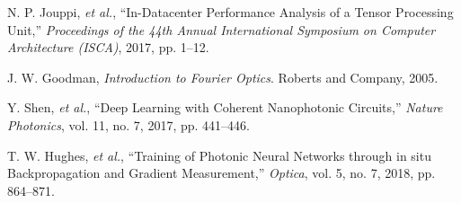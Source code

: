 \documentclass[conference]{IEEEtran}
\begin{document}

\begin{thebibliography}{00}
 N. P. Jouppi, \emph{et al.}, ``In-Datacenter Performance Analysis of a Tensor Processing Unit,'' \emph{Proceedings of the 44th Annual International Symposium on Computer Architecture (ISCA)}, 2017, pp. 1--12.

 J. W. Goodman, \emph{Introduction to Fourier Optics}. Roberts and Company, 2005.

 Y. Shen, \emph{et al.}, ``Deep Learning with Coherent Nanophotonic Circuits,'' \emph{Nature Photonics}, vol. 11, no. 7, 2017, pp. 441--446.

 T. W. Hughes, \emph{et al.}, ``Training of Photonic Neural Networks through in situ Backpropagation and Gradient Measurement,'' \emph{Optica}, vol. 5, no. 7, 2018, pp. 864--871.
\end{thebibliography}
\end{document}
